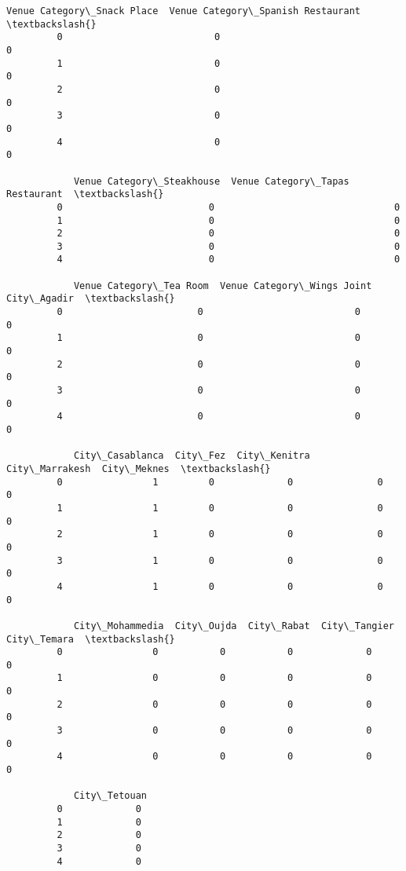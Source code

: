 \documentclass[11pt]{article}
\begin{document}
\begin{Verbatim}[commandchars=\\\{\}]
            Venue Category\_Snack Place  Venue Category\_Spanish Restaurant  \textbackslash{}
         0                           0                                  0   
         1                           0                                  0   
         2                           0                                  0   
         3                           0                                  0   
         4                           0                                  0   
         
            Venue Category\_Steakhouse  Venue Category\_Tapas Restaurant  \textbackslash{}
         0                          0                                0   
         1                          0                                0   
         2                          0                                0   
         3                          0                                0   
         4                          0                                0   
         
            Venue Category\_Tea Room  Venue Category\_Wings Joint  City\_Agadir  \textbackslash{}
         0                        0                           0            0   
         1                        0                           0            0   
         2                        0                           0            0   
         3                        0                           0            0   
         4                        0                           0            0   
         
            City\_Casablanca  City\_Fez  City\_Kenitra  City\_Marrakesh  City\_Meknes  \textbackslash{}
         0                1         0             0               0            0   
         1                1         0             0               0            0   
         2                1         0             0               0            0   
         3                1         0             0               0            0   
         4                1         0             0               0            0   
         
            City\_Mohammedia  City\_Oujda  City\_Rabat  City\_Tangier  City\_Temara  \textbackslash{}
         0                0           0           0             0            0   
         1                0           0           0             0            0   
         2                0           0           0             0            0   
         3                0           0           0             0            0   
         4                0           0           0             0            0   
         
            City\_Tetouan  
         0             0  
         1             0  
         2             0  
         3             0  
         4             0  
\end{Verbatim}
            
\end{document}
